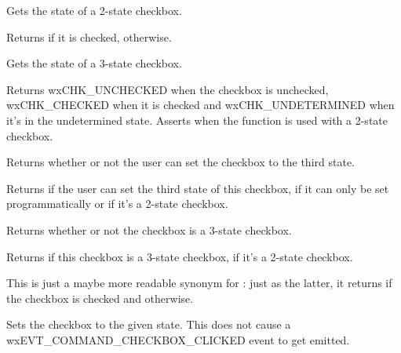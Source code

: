 
Gets the state of a 2-state checkbox.


Returns \true if it is checked, \false otherwise.

\label{wxcheckboxgetthreestatevalue}


Gets the state of a 3-state checkbox.


Returns wxCHK\_UNCHECKED when the checkbox is unchecked, wxCHK\_CHECKED
 when it is checked and wxCHK\_UNDETERMINED when it's in the undetermined
state. Asserts when the function is used with a 2-state checkbox.

\label{wxcheckboxis3rdstateallowedforuser}


Returns whether or not the user can set the checkbox to the third state.


Returns \true if the user can set the third state of this checkbox, \false if it can only be set
programmatically or if it's a 2-state checkbox.

\label{wxcheckboxis3state}


Returns whether or not the checkbox is a 3-state checkbox.


Returns \true if this checkbox is a 3-state checkbox, \false if it's a 2-state checkbox.

\label{wxcheckboxischecked}


This is just a maybe more readable synonym for 
: just as the latter, it returns 
\true if the checkbox is checked and \false otherwise.

\label{wxcheckboxsetvalue}


Sets the checkbox to the given state. This does not cause a
wxEVT\_COMMAND\_CHECKBOX\_CLICKED event to get emitted.

